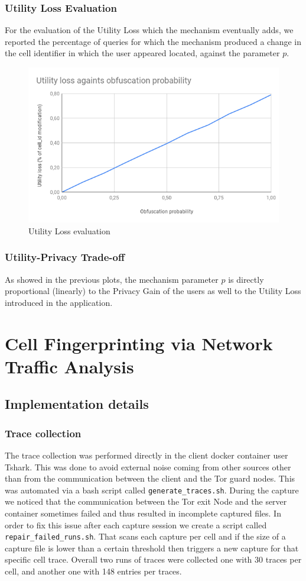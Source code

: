 \documentclass[10pt,conference,compsocconf]{IEEEtran}
\begin{document}
\subsubsection{Utility Loss Evaluation}
For the evaluation of the Utility Loss which the mechanism eventually adds, we
reported the percentage of queries for which the mechanism produced a change in
the cell identifier in which the user appeared located, against the parameter
$p$.
\begin{figure}[h!]
    \centering
    \includegraphics[width=0.5\linewidth]{../privacy_evaluation/defence_evaluation/utility_loss.png}
    \caption{Utility Loss evaluation}
\end{figure}
\subsubsection{Utility-Privacy Trade-off}
As showed in the previous plots, the mechanism parameter $p$ is directly
proportional (linearly) to the Privacy Gain of the users as well to the Utility
Loss introduced in the application.
\section{Cell Fingerprinting via Network Traffic Analysis}

\subsection{Implementation details}

\subsubsection{Trace collection}
The trace collection was performed directly in the client docker container user Tshark.
This was done to avoid external noise coming from other sources other than from the communication between the client and the Tor guard nodes.
This was automated via a bash script called \texttt{generate\_traces.sh}. During the capture we noticed that the communication between
the Tor exit Node and the server container sometimes failed and thus resulted in incomplete captured files. In order to fix this issue
after each capture session we create a script called \texttt{repair\_failed\_runs.sh}. That scans each capture per cell and if the size of a capture file 
is lower than a certain threshold then triggers a new capture for that specific cell trace. Overall two runs of traces
were collected one with 30 traces per cell, and another one with 148 entries per traces.
\end{document}
